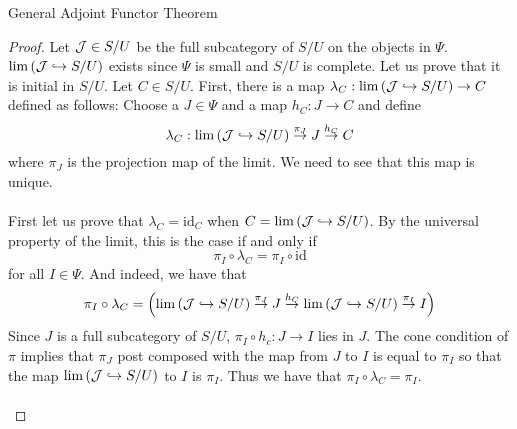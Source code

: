 \documentclass[a4paper]{article}
\begin{document}
\begin{thm}{General Adjoint Functor Theorem}{}
\begin{proof}
Let $\mathcal{J}\in S/U$ be the full subcategory of $S/U$ on the objects in $\Psi$. $\lim\left(\mathcal{J}\hookrightarrow S/U\right)$ exists since $\Psi$ is small and $S/U$ is complete. Let us prove that it is initial in $S/U$. Let $C\in S/U$. First, there is a map $\lambda_C:\lim\left(\mathcal{J}\hookrightarrow S/U\right)\to C$ defined as follows: Choose a $J\in\Psi$ and a map $h_C:J\to C$ and define $$\lambda_C:\lim\left(\mathcal{J}\hookrightarrow S/U\right)\overset{\pi_J}{\to}J\overset{h_C}{\to}C$$ where $\pi_J$ is the projection map of the limit. We need to see that this map is unique. \\~\\

First let us prove that $\lambda_C=\text{id}_C$ when $C=\lim\left(\mathcal{J}\hookrightarrow S/U\right)$. By the universal property of the limit, this is the case if and only if $$\pi_I\circ\lambda_C=\pi_I\circ\text{id}$$ for all $I\in\Psi$. And indeed, we have that $$\pi_I\circ\lambda_C=\left(\lim\left(\mathcal{J}\hookrightarrow S/U\right)\overset{\pi_J}{\to}J\overset{h_C}{\to}\lim\left(\mathcal{J}\hookrightarrow S/U\right)\overset{\pi_I}{\to}I\right)$$ Since $J$ is a full subcategory of $S/U$, $\pi_I\circ h_c:J\to I$ lies in $J$. The cone condition of $\pi$ implies that $\pi_J$ post composed with the map from $J$ to $I$ is equal to $\pi_I$ so that the map $\lim\left(\mathcal{J}\hookrightarrow S/U\right)$ to $I$ is $\pi_I$. Thus we have that $\pi_I\circ\lambda_C=\pi_I$. \\~\\


\end{proof}
\end{thm}
\end{document}
